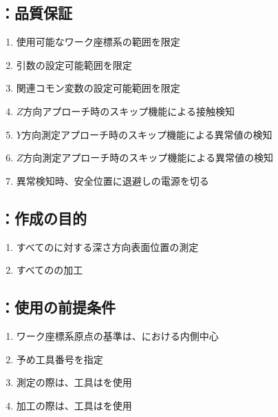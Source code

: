 \subsection{\MCenterline：品質保証}
\begin{enumerate}[label*=\sarrow]
\item 使用可能なワーク座標系の範囲を限定
\item {}引数の設定可能範囲を限定
\item 関連コモン変数の設定可能範囲を限定
\item $Z$方向アプローチ時のスキップ機能による接触検知
\item $Y$方向測定アプローチ時のスキップ機能による異常値の検知
\item $Z$方向測定アプローチ時のスキップ機能による異常値の検知
\item 異常検知時、安全位置に退避し\TouchSensorProbe の電源を切る
\end{enumerate}



\clearpage


\subsection{\DLone：作成の目的}
\begin{enumerate}[label*=\sarrow]
\item すべての\Dimple に対する深さ方向表面位置の測定
\item すべての\Dimple の加工
\end{enumerate}


\subsection{\DLone：使用の前提条件}
\begin{enumerate}[label*=\sarrow]
\item {}ワーク座標系原点の基準は、\TopEndFace における内側中心
\item 予め工具番号を指定
\item 測定の際は、工具は\TouchSensorProbe を使用
\item 加工の際は、工具は\TSlotCutter を使用
\end{enumerate}


